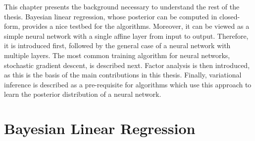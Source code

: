 \documentclass[msc,deptreport.inf]{infthesis} %
\begin{document}
This chapter presents the background necessary to understand the rest of the thesis. Bayesian linear regression, whose posterior can be computed in closed-form, provides a nice testbed for the algorithms. Moreover, it can be viewed as a simple neural network with a single affine layer from input to output. Therefore, it is introduced first, followed by the general case of a neural network with multiple layers. The most common training algorithm for neural networks, stochastic gradient descent, is described next. Factor analysis is then introduced, as this is the basis of the main contributions in this thesis. Finally, variational inference is described as a pre-requisite for algorithms which use this approach to learn the posterior distribution of a neural network. 

\section{Bayesian Linear Regression}\label{sec:bayesian_lr}
\end{document}
